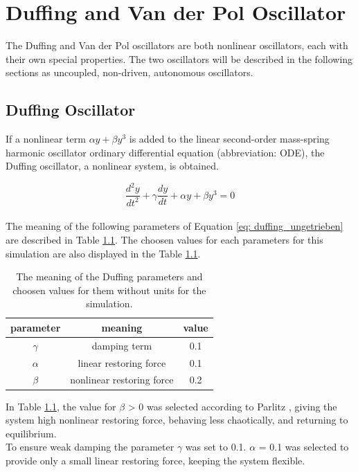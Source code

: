 \documentclass[oneside,10pt,a4paper]{report}
\begin{document}
	\chapter{Duffing and Van der Pol Oscillator} \label{chapter: Duffing- and Van der Pol Oscillator}
	
		The Duffing and Van der Pol oscillators are both nonlinear oscillators, each with their own special properties. 
		The two oscillators will be described in the following sections as uncoupled, non-driven, autonomous oscillators.
		
		\section{Duffing Oscillator}
		If a nonlinear term $\alpha y + \beta y^3$ is added to the linear second-order mass-spring harmonic oscillator ordinary differential equation (abbreviation: ODE), the Duffing oscillator\cite{twist_paper}, a nonlinear system, is obtained.
		
		\begin{equation}\label{eq: duffing_ungetrieben}
			\frac{d^2y}{dt^2} + \gamma \frac{dy}{dt} + \alpha y + \beta y^3 = 0
		\end{equation}
		\\
		The meaning of the following parameters of Equation \ref{eq: duffing_ungetrieben} are described in Table \ref{tab: duffing_ungetriebene_parameter}. The choosen values for each parameters for this simulation are also displayed in the Table \ref{tab: duffing_ungetriebene_parameter}.
		
			\begin{table}[H]
			\centering
			\caption{The meaning of the Duffing parameters and choosen values for them without units for the simulation.}
			\label{tab: duffing_ungetriebene_parameter}
			\begin{tabular}{c c c}
				\toprule
				parameter & meaning & value\\
				\midrule
				$\gamma$ & damping term & 0.1\\
				$\alpha$ & linear restoring force & 0.1\\
				$\beta$& nonlinear restoring force & 0.2\cite{Parlitz_p93}\\
				\bottomrule
			\end{tabular}
		\end{table}
		
		In Table \ref{tab: duffing_ungetriebene_parameter}, the value for $\beta$ > 0 was selected according to Parlitz \cite{Parlitz_p93}, giving the system high nonlinear restoring force, behaving less chaotically, and returning to equilibrium. \\
		To ensure weak damping the parameter $\gamma$ was set to 0.1. $\alpha$ = 0.1 was selected to provide only a small linear restoring force, keeping the system flexible.
		
\end{document}
